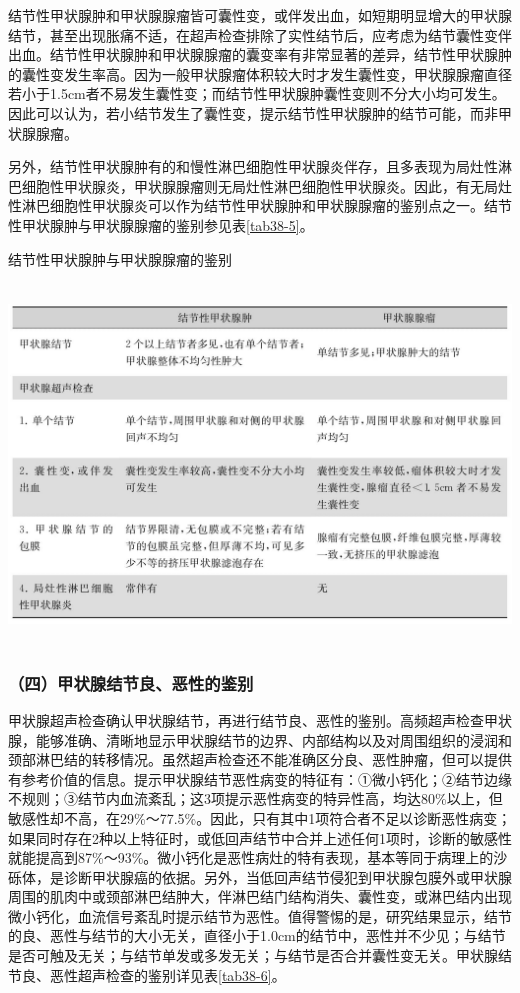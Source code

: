 结节性甲状腺肿和甲状腺腺瘤皆可囊性变，或伴发出血，如短期明显增大的甲状腺结节，甚至出现胀痛不适，在超声检查排除了实性结节后，应考虑为结节囊性变伴出血。结节性甲状腺肿和甲状腺腺瘤的囊变率有非常显著的差异，结节性甲状腺肿的囊性变发生率高。因为一般甲状腺瘤体积较大时才发生囊性变，甲状腺腺瘤直径若小于1.5cm者不易发生囊性变；而结节性甲状腺肿囊性变则不分大小均可发生。因此可以认为，若小结节发生了囊性变，提示结节性甲状腺肿的结节可能，而非甲状腺腺瘤。

另外，结节性甲状腺肿有的和慢性淋巴细胞性甲状腺炎伴存，且多表现为局灶性淋巴细胞性甲状腺炎，甲状腺腺瘤则无局灶性淋巴细胞性甲状腺炎。因此，有无局灶性淋巴细胞性甲状腺炎可以作为结节性甲状腺肿和甲状腺腺瘤的鉴别点之一。结节性甲状腺肿与甲状腺腺瘤的鉴别参见表\ref{tab38-5}。

\begin{table}[htbp]
\centering
\caption{结节性甲状腺肿与甲状腺腺瘤的鉴别}
\label{tab38-5}
\includegraphics[width=5.92708in,height=3.76042in]{./images/Image00242.jpg}
\end{table}

\subsubsection{（四）甲状腺结节良、恶性的鉴别}

甲状腺超声检查确认甲状腺结节，再进行结节良、恶性的鉴别。高频超声检查甲状腺，能够准确、清晰地显示甲状腺结节的边界、内部结构以及对周围组织的浸润和颈部淋巴结的转移情况。虽然超声检查还不能准确区分良、恶性肿瘤，但可以提供有参考价值的信息。提示甲状腺结节恶性病变的特征有：①微小钙化；②结节边缘不规则；③结节内血流紊乱；这3项提示恶性病变的特异性高，均达80\%以上，但敏感性却不高，在29\%～77.5\%。因此，只有其中1项符合者不足以诊断恶性病变；如果同时存在2种以上特征时，或低回声结节中合并上述任何1项时，诊断的敏感性就能提高到87\%～93\%。微小钙化是恶性病灶的特有表现，基本等同于病理上的沙砾体，是诊断甲状腺癌的依据。另外，当低回声结节侵犯到甲状腺包膜外或甲状腺周围的肌肉中或颈部淋巴结肿大，伴淋巴结门结构消失、囊性变，或淋巴结内出现微小钙化，血流信号紊乱时提示结节为恶性。值得警惕的是，研究结果显示，结节的良、恶性与结节的大小无关，直径小于1.0cm的结节中，恶性并不少见；与结节是否可触及无关；与结节单发或多发无关；与结节是否合并囊性变无关。甲状腺结节良、恶性超声检查的鉴别详见表\ref{tab38-6}。

